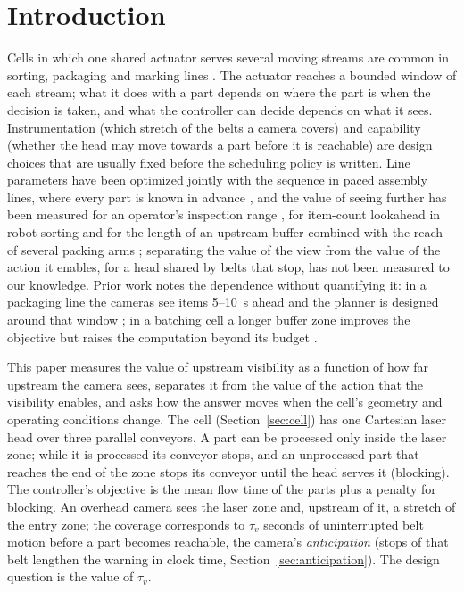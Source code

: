 \documentclass[11pt,a4paper]{article}
\newcommand{\tv}{\tau_{v}}
\begin{document}
\section{Introduction}
Cells in which one shared actuator serves several moving streams are common in sorting,
packaging and marking lines \cite{S01_Mattone2000,S02_Han2020,S03_Nielsen2023,S04_Schettini2023}.
The actuator reaches a bounded window of each stream; what it does with a part depends on
where the part is when the decision is taken, and what the controller can decide depends on
what it sees. Instrumentation (which stretch of the belts a camera covers) and capability
(whether the head may move towards a part before it is reachable) are design choices that
are usually fixed before the scheduling policy is written. Line parameters have been
optimized jointly with the sequence in paced assembly lines, where every part is known in
advance \cite{Sarker2001}, and the value of seeing further has been measured for an
operator's inspection range \cite{Nawijn1981}, for item-count lookahead in robot sorting
\cite{Li2026} and for the length of an upstream buffer combined with the reach of several
packing arms \cite{Ladefoged2026}; separating the value of the view from the value of the
action it enables, for a head shared by belts that stop, has not been measured to our
knowledge.
Prior work notes the dependence without quantifying it: in a packaging line the cameras
see items 5--10~s ahead and the planner is designed around that window
\cite{S04_Schettini2023}; in a batching cell a longer buffer zone improves the objective
but raises the computation beyond its budget \cite{S03_Nielsen2023}.

This paper measures the value of upstream visibility as a function of how far upstream
the camera sees, separates it from the value of the action that the visibility enables,
and asks how the answer moves when the cell's geometry and operating conditions change.
The cell (Section~\ref{sec:cell}) has one Cartesian laser head over three parallel
conveyors. A part can be processed only inside the laser zone; while it is processed its
conveyor stops, and an unprocessed part that reaches the end of the zone stops its
conveyor until the head serves it (blocking). The controller's objective is the mean flow
time of the parts plus a penalty for blocking. An overhead camera sees the laser zone and,
upstream of it, a stretch of the entry zone; the coverage corresponds to $\tv$ seconds of
uninterrupted belt motion before a part becomes reachable, the camera's
\emph{anticipation} (stops of that belt lengthen the warning in clock time,
Section~\ref{sec:anticipation}). The design question is the value
of $\tv$.
\end{document}
